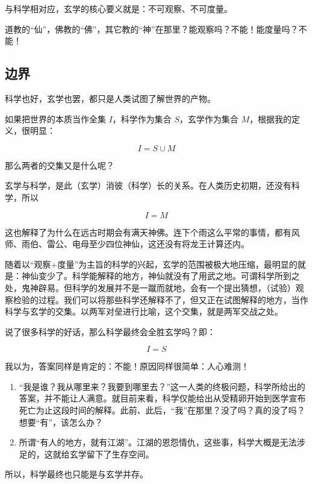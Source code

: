 与科学相对应，玄学的核心要义就是：不可观察、不可度量。

道教的“仙”，佛教的“佛”，其它教的“神”在那里？能观察吗？不能！能度量吗？不能！

\subsection{边界}

科学也好，玄学也罢，都只是人类试图了解世界的产物。

如果把世界的本质当作全集 $I$，科学作为集合 $S$，玄学作为集合 $M$，根据我的定义，很明显：

$$ I = S \cup M $$

那么两者的交集又是什么呢？

玄学与科学，是此（玄学）消彼（科学）长的关系。在人类历史初期，还没有科学，所以

$$ I =M $$

这也解释了为什么在远古时期会有满天神佛。连下个雨这么平常的事情，都有风师、雨伯、雷公、电母至少四位神仙，这还没有将龙王计算还内。

随着以“观察+度量”为主旨的科学的兴起，玄学的范围被极大地压缩，最明显的就是：神仙变少了。科学能解释的地方，神仙就没有了用武之地。可谓科学所到之处，鬼神辟易。但科学的发展并不是一蹴而就地，会有一个提出猜想，（试验）观察检验的过程。我们可以将那些科学还解释不了，但又正在试图解释的地方，当作科学与玄学的交集。以两军对垒进行比喻，这个交集，就是两军交战之处。

说了很多科学的好话，那么科学最终会全胜玄学吗？即：

$$ I = S $$

我以为，答案同样是肯定的：不能！原因同样很简单：人心难测！

\begin{enumerate}[nosep, left=\parindent]
    \item “我是谁？我从哪里来？我要到哪里去？”这一人类的终极问题，科学所给出的答案，并不能让人满意。就目前来看，科学仅能给出从受精卵开始到医学宣布死亡为止这段时间的解释。此前、此后，“我”在那里？没了吗？真的没了吗？想要“有”，该怎么办？
    \item 所谓“有人的地方，就有江湖”。江湖的恩怨情仇，这些事，科学大概是无法涉足的，这就给玄学留下了生存空间。
\end{enumerate}

所以，科学最终也只能是与玄学并存。
